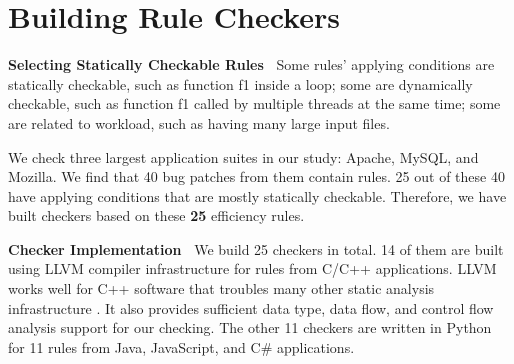 
\section{Building Rule Checkers}

{\bf Selecting Statically Checkable Rules\ }
Some rules' applying conditions are statically checkable, such as function f1 
inside a loop; some are dynamically checkable, such as function f1 called by 
multiple threads at the same time; some are related to
workload, such as having many large input files. 

We check three largest application suites in our study: Apache, MySQL, and Mozilla.
We find that 40 bug patches from them contain rules.
25 out of these 40 have applying conditions that are mostly statically
checkable. Therefore, we have built checkers based on these {{\bf 25} 
efficiency rules}.

{\bf Checker Implementation\ }
We build 25 checkers in total. 
14 of them are built using LLVM compiler infrastructure \citep{llvm} for 
rules from C/C++ applications. LLVM works well for C++ software that troubles 
many other static analysis infrastructure \citep{10yearlinux}. 
It also provides sufficient data type, data flow, and control 
flow analysis support for our checking. The other 11 checkers are 
written in Python for 11 rules from Java, JavaScript, and C\# applications.


